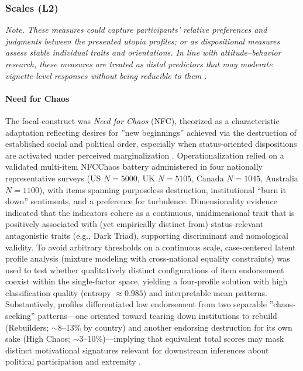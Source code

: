 \documentclass[jou,floatsintext]{apa7}
\begin{document}
\subsubsection{Scales (L2)}
\label{sec:scalesL2}


\textit{Note. These measures could capture participants’ relative preferences and judgments between the presented utopia profiles; or as dispositional measures assess stable individual traits and orientations. In line with attitude--behavior research, these measures are treated as distal predictors that may moderate vignette-level responses without being reducible to them \parencite{ajzenInfluenceAttitudesBehavior2018}.}



\paragraph{Need for Chaos}

The focal construct was \emph{Need for Chaos} (NFC), theorized as a characteristic adaptation reflecting desires for ''new beginnings'' achieved via the destruction of established social and political order, especially when status-oriented dispositions are activated under perceived marginalization \parencite{arceneauxPeopleJustWant2021}. Operationalization relied on a validated multi-item NFCChaos battery administered in four nationally representative surveys (US $N{=}5000$, UK $N{=}5105$, Canada $N{=}1045$, Australia $N{=}1100$), with items spanning purposeless destruction, institutional “burn it down” sentiments, and a preference for turbulence. Dimensionality evidence indicated that the indicators cohere as a continuous, unidimensional trait that is positively associated with (yet empirically distinct from) status-relevant antagonistic traits (e.g., Dark Triad), supporting discriminant and nomological validity. To avoid arbitrary thresholds on a continuous scale, case-centered latent profile analysis (mixture modeling with cross-national equality constraints) was used to test whether qualitatively distinct configurations of item endorsement coexist within the single-factor space, yielding a four-profile solution with high classification quality (entropy $\approx 0.985$) and interpretable mean patterns. Substantively, profiles differentiated low endorsement from two separable ''chaos-seeking'' patterns—one oriented toward tearing down institutions to rebuild (Rebuilders; $\sim$8--13\% by country) and another endorsing destruction for its own sake (High Chaos; $\sim$3--10\%)—implying that equivalent total scores may mask distinct motivational signatures relevant for downstream inferences about political participation and extremity \parencite{arceneauxPeopleJustWant2021}.
\end{document}
